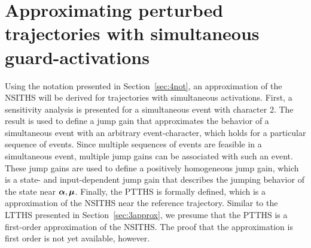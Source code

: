 \documentclass[../DC2017114Bouma.tex]{subfiles}
\begin{document}
\section{Approximating perturbed trajectories with simultaneous guard-activations}
Using the notation presented in Section~\ref{sec:4not}, an approximation of the NSITHS will be derived for trajectories with simultaneous activations. First, a sensitivity analysis is presented for a simultaneous event with character 2. The result is used to define a jump gain that approximates the behavior of a simultaneous event with an arbitrary event-character, which holds for a particular sequence of events. Since multiple sequences of events are feasible in a simultaneous event, multiple jump gains can be associated with such an event. These jump gains are used to define a positively homogeneous jump gain, which is a state- and input-dependent jump gain that describes the jumping behavior of the state near $\boldsymbol{\alpha},\boldsymbol{\mu}$. Finally, the PTTHS is formally defined, which is a approximation of the NSITHS near the reference trajectory. Similar to the LTTHS presented in Section~\ref{sec:3approx}, we presume that the PTTHS is a first-order approximation of the NSITHS. The proof that the approximation is first order is not yet available, however.
\end{document}
